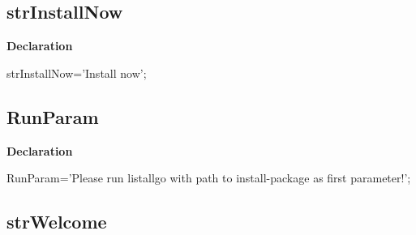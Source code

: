 \documentclass{report}
\newif\ifpdf
\begin{document}
\subsection*{strInstallNow}
\fi
\label{trstrings-strInstallNow}
\begin{list}{}{
\setlength{\itemindent}{0cm}
\setlength{\listparindent}{0cm}
\setlength{\leftmargin}{\evensidemargin}
\addtolength{\leftmargin}{\tmplength}
\settowidth{\labelsep}{X}
\addtolength{\leftmargin}{\labelsep}
\setlength{\labelwidth}{\tmplength}
}
\item[\textbf{Declaration}\hfill]
\ifpdf
\begin{flushleft}
\fi
\begin{ttfamily}
strInstallNow='Install now';\end{ttfamily}

\ifpdf
\end{flushleft}
\fi

\end{list}
\ifpdf
\subsection*{\large{\textbf{RunParam}}\normalsize\hspace{1ex}\hrulefill}
\else
\subsection*{RunParam}
\fi
\label{trstrings-RunParam}
\begin{list}{}{
\setlength{\itemindent}{0cm}
\setlength{\listparindent}{0cm}
\setlength{\leftmargin}{\evensidemargin}
\addtolength{\leftmargin}{\tmplength}
\settowidth{\labelsep}{X}
\addtolength{\leftmargin}{\labelsep}
\setlength{\labelwidth}{\tmplength}
}
\item[\textbf{Declaration}\hfill]
\ifpdf
\begin{flushleft}
\fi
\begin{ttfamily}
RunParam='Please run listallgo with path to install-package as first parameter!';\end{ttfamily}

\ifpdf
\end{flushleft}
\fi

\end{list}
\ifpdf
\subsection*{\large{\textbf{strWelcome}}\normalsize\hspace{1ex}\hrulefill}
\else
\end{document}
